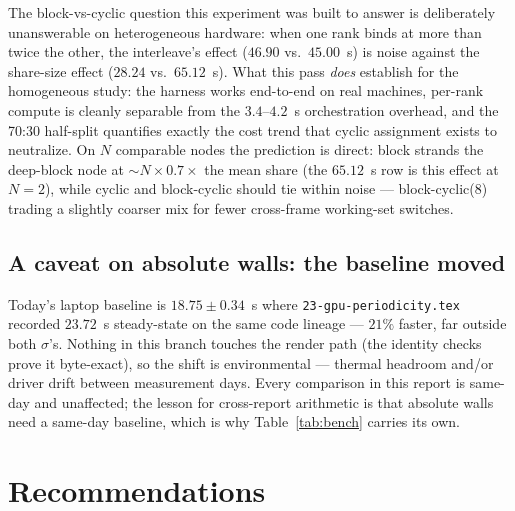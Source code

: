 \documentclass[
	english,
	letterpaper, oneside
]{article}
\begin{document}
The block-vs-cyclic question this experiment was built to answer is
deliberately unanswerable on heterogeneous hardware: when one rank binds at
more than twice the other, the interleave's effect ($46.90$ vs.\ $45.00$~s)
is noise against the share-size effect ($28.24$ vs.\ $65.12$~s). What this
pass \emph{does} establish for the homogeneous study: the harness works
end-to-end on real machines, per-rank compute is cleanly separable from the
$3.4$--$4.2$~s orchestration overhead, and the 70:30 half-split quantifies
exactly the cost trend that cyclic assignment exists to neutralize. On
$N$ comparable nodes the prediction is direct: block strands the deep-block
node at $\sim$$N\times0.7\times$ the mean share (the $65.12$~s row is this
effect at $N=2$), while cyclic and block-cyclic should tie within noise ---
block-cyclic(8) trading a slightly coarser mix for fewer cross-frame
working-set switches.

\subsection{A caveat on absolute walls: the baseline moved}
\label{sec:drift}

Today's laptop baseline is $18.75\pm0.34$~s where
\texttt{23-gpu-periodicity.tex} recorded $23.72$~s steady-state on the same
code lineage --- $21\%$ faster, far outside both $\sigma$'s. Nothing in
this branch touches the render path (the identity checks prove it
byte-exact), so the shift is environmental --- thermal headroom and/or
driver drift between measurement days. Every comparison in this report is
same-day and unaffected; the lesson for cross-report arithmetic is that
absolute walls need a same-day baseline, which is why
Table~\ref{tab:bench} carries its own.

\section{Recommendations}
\label{sec:recommendations}
\end{document}
